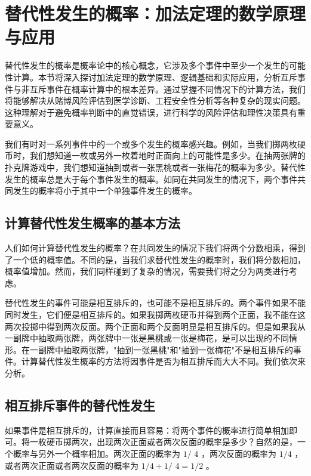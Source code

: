 \section{替代性发生的概率：加法定理的数学原理与应用}

\begin{logicbox}[title=引言]
替代性发生的概率是概率论中的核心概念，它涉及多个事件中至少一个发生的可能性计算。本节将深入探讨加法定理的数学原理、逻辑基础和实际应用，分析互斥事件与非互斥事件在概率计算中的根本差异。通过掌握不同情况下的计算方法，我们将能够解决从赌博风险评估到医学诊断、工程安全性分析等各种复杂的现实问题。这种理解对于避免概率判断中的直觉错误，进行科学的风险评估和理性决策具有重要意义。
\end{logicbox}

我们有时对一系列事件中的一个或多个发生的概率感兴趣。例如，当我们掷两枚硬币时，我们想知道一枚或另外一枚着地时正面向上的可能性是多少。在抽两张牌的扑克牌游戏中，我们想知道抽到或者一张黑桃或者一张梅花的概率为多少。替代性发生的概率总是大于每个事件发生的概率。如同在共同发生的情况下，两个事件共同发生的概率将小于其中一个单独事件发生的概率。

\subsection{计算替代性发生概率的基本方法}

人们如何计算替代性发生的概率？在共同发生的情况下我们将两个分数相乘，得到了一个低的概率值。不同的是，当我们求替代性发生的概率时，我们将分数相加，概率值增加。然而，我们同样碰到了复杂的情况，需要我们将之分为两类进行考虑。

替代性发生的事件可能是相互排斥的，也可能不是相互排斥的。两个事件如果不能同时发生，它们便是相互排斥的。如果我掷两枚硬币并得到两个正面，我不能在这两次投掷中得到两次反面。两个正面和两个反面明显是相互排斥的。但是如果我从一副牌中抽取两张牌，两张牌中一张是黑桃或一张是梅花，是可以出现的不同情形。在一副牌中抽取两张牌，"抽到一张黑桃"和"抽到一张梅花"不是相互排斥的事件。计算替代性发生概率的方法将因事件是否为相互排斥而大大不同。我们依次来分析。

\subsection{相互排斥事件的替代性发生}

如果事件是相互排斥的，计算直接而且容易：将两个事件的概率进行简单相加即可。将一枚硬币掷两次，出现两次正面或者两次反面的概率是多少？自然的是，一个概率与另外一个概率相加。两次正面的概率为 $1 /$ 4 ，两次反面的概率为 $1 / 4$ ，或者两次正面或者两次反面的概率为 $1 / 4+1 /$ $4=1 / 2$ 。

